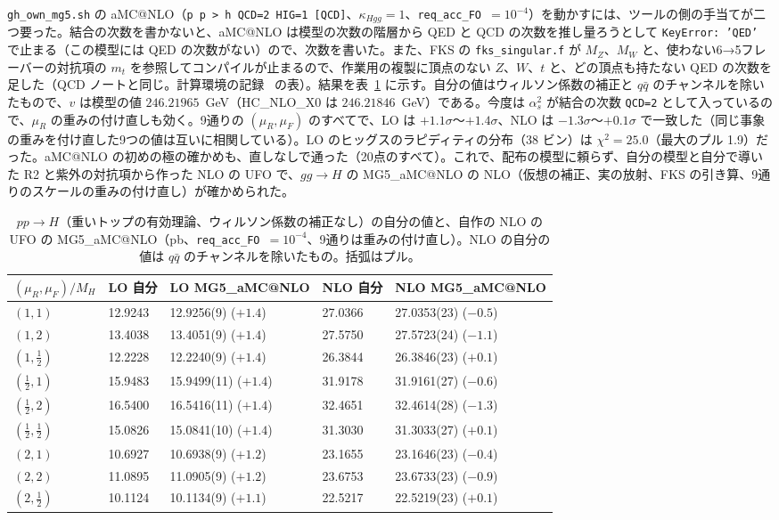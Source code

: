 \documentclass[a4paper,10pt]{ltjsarticle}
\makeatletter
\newcommand{\MGaMC}{MG5\_aMC@NLO}
\makeatother
\begin{document}
\texttt{gh\_own\_mg5.sh} の aMC@NLO（\texttt{p p > h QCD=2 HIG=1 [QCD]}、$\kappa_{Hgg}=1$、\texttt{req\_acc\_FO}~$=10^{-4}$）を動かすには、ツールの側の手当てが二つ要った。結合の次数を書かないと、aMC@NLO は模型の次数の階層から QED と QCD の次数を推し量ろうとして \texttt{KeyError: 'QED'} で止まる（この模型には QED の次数がない）ので、次数を書いた。また、FKS の \texttt{fks\_singular.f} が $M_Z$、$M_W$ と、使わない6→5フレーバーの対抗項の $m_t$ を参照してコンパイルが止まるので、作業用の複製に頂点のない $Z$、$W$、$t$ と、どの頂点も持たない QED の次数を足した（QCD ノートと同じ。計算環境の記録~\cite{env} の表）。結果を表~\ref{tab:ghown} に示す。自分の値はウィルソン係数の補正と $q\bar q$ のチャンネルを除いたもので、$v$ は模型の値 $246.21965$~GeV（HC\_NLO\_X0 は $246.21846$~GeV）である。今度は $\alpha_s^2$ が結合の次数 \texttt{QCD=2} として入っているので、$\mu_R$ の重みの付け直しも効く。9通りの $(\mu_R,\mu_F)$ のすべてで、LO は $+1.1\sigma$〜$+1.4\sigma$、NLO は $-1.3\sigma$〜$+0.1\sigma$ で一致した（同じ事象の重みを付け直した9つの値は互いに相関している）。LO のヒッグスのラピディティの分布（38 ビン）は $\chi^2=25.0$（最大のプル 1.9）だった。aMC@NLO の初めの極の確かめも、直しなしで通った（20点のすべて）。これで、配布の模型に頼らず、自分の模型と自分で導いた R2 と紫外の対抗項から作った NLO の UFO で、$gg\to H$ の \MGaMC{} の NLO（仮想の補正、実の放射、FKS の引き算、9通りのスケールの重みの付け直し）が確かめられた。

\begin{table}[htbp]
\centering\small
\caption{$pp\to H$（重いトップの有効理論、ウィルソン係数の補正なし）の自分の値と、自作の NLO の UFO の \MGaMC{}（pb、\texttt{req\_acc\_FO}~$=10^{-4}$、9通りは重みの付け直し）。NLO の自分の値は $q\bar q$ のチャンネルを除いたもの。括弧はプル。}
\label{tab:ghown}
\begin{tabular}{lllll}
\toprule
$(\mu_R,\mu_F)/M_H$ & LO 自分 & LO \MGaMC{} & NLO 自分 & NLO \MGaMC{} \\
\midrule
$(1,1)$ & 12.9243 & 12.9256(9) ($+1.4$) & 27.0366 & 27.0353(23) ($-0.5$) \\
$(1,2)$ & 13.4038 & 13.4051(9) ($+1.4$) & 27.5750 & 27.5723(24) ($-1.1$) \\
$(1,\frac12)$ & 12.2228 & 12.2240(9) ($+1.4$) & 26.3844 & 26.3846(23) ($+0.1$) \\
$(\frac12,1)$ & 15.9483 & 15.9499(11) ($+1.4$) & 31.9178 & 31.9161(27) ($-0.6$) \\
$(\frac12,2)$ & 16.5400 & 16.5416(11) ($+1.4$) & 32.4651 & 32.4614(28) ($-1.3$) \\
$(\frac12,\frac12)$ & 15.0826 & 15.0841(10) ($+1.4$) & 31.3030 & 31.3033(27) ($+0.1$) \\
$(2,1)$ & 10.6927 & 10.6938(9) ($+1.2$) & 23.1655 & 23.1646(23) ($-0.4$) \\
$(2,2)$ & 11.0895 & 11.0905(9) ($+1.2$) & 23.6753 & 23.6733(23) ($-0.9$) \\
$(2,\frac12)$ & 10.1124 & 10.1134(9) ($+1.1$) & 22.5217 & 22.5219(23) ($+0.1$) \\
\bottomrule
\end{tabular}
\end{table}
\end{document}
